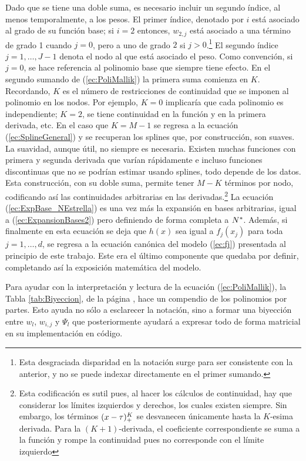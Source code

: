 \documentclass[../Main/Main.tex]{subfiles}
\begin{document}
Dado que se tiene una doble suma, es necesario incluir un segundo índice, al menos temporalmente, a los pesos. El primer índice, denotado por $i$ está asociado al grado de su función base; si $i = 2$ entonces, $w_{2,j}$ está asociado a una término de grado 1 cuando $j = 0$, pero a uno de grado $2$ si $j>0$.\footnote{Esta desgraciada disparidad en la notación surge para ser consistente con la anterior, y no se puede indexar directamente en el primer sumando.} El segundo índice $j = 1,\ldots, J-1$ denota el nodo al que está asociado el peso. Como convención, si $j = 0$, se hace referencia al polinomio base que siempre tiene efecto. En el segundo sumando de (\ref{ec:PoliMallik}) la primera suma comienza en $K$. Recordando, $K$ es el número de restricciones de continuidad que se imponen al polinomio en los nodos. Por ejemplo, $K = 0$ implicaría que cada polinomio es independiente; $K = 2$, se tiene continuidad en la función y en la primera derivada, etc. En el caso que $K = M - 1$ se regresa a la ecuación (\ref{ec:SplineGeneral}) y se recuperan los splines que, por construcción, son suaves. La suavidad, aunque útil, no siempre es necesaria. Existen muchas funciones con primera y segunda derivada que varían rápidamente e incluso funciones discontinuas que no se podrían estimar usando splines, todo depende de los datos. Esta construcción, con su doble suma, permite tener $M-K$ términos por nodo, codificando así las continuidades arbitrarias en las derivadas.\footnote{Esta codificación es sutil pues, al hacer los cálculos de continuidad, hay que considerar los límites izquierdos y derechos, los cuales existen siempre. Sin embargo, los términos $(x-\tau)^K_+$ se desvanecen únicamente hasta la $K$-esima derivada. Para la $(K+1)$-derivada, el coeficiente correspondiente se suma a la función y rompe la continuidad pues no corresponde con el límite izquierdo} La ecuación (\ref{ec:ExpBase_NEstrella}) es una vez más la expansión en bases arbitrarias, igual a (\ref{ec:ExpansionBases2}) pero definiendo de forma completa a $N^*$. Además, si finalmente en esta ecuación se deja que $h(x)$ sea igual a $f_j(x_j)$ para toda $j = 1,\ldots,d$, se regresa a la ecuación canónica del modelo (\ref{ec:fj}) presentada al principio de este trabajo. Este era el último componente que quedaba por definir, completando así la exposición matemática del modelo.

Para ayudar con la interpretación y lectura de la ecuación (\ref{ec:PoliMallik}), la Tabla \ref{tab:Biyeccion}, de la página \pageref{tab:Biyeccion}, hace un compendio de los polinomios por partes. Esto ayuda no sólo a esclarecer la notación, sino a formar una biyección entre $w_l$, $w_{i,j}$ y $\Psi_l$ que posteriormente ayudará a expresar todo de forma matricial en su implementación en código.
\end{document}

